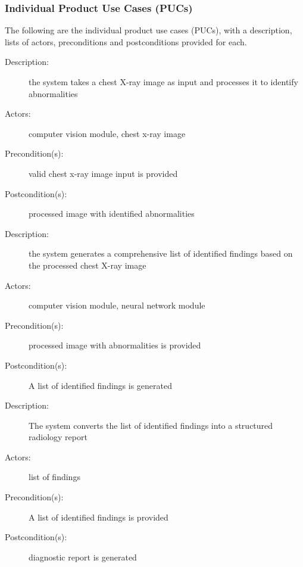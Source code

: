 \documentclass[12pt]{article}
\begin{document}
\subsubsection{Individual Product Use Cases (PUCs)}
The following are the individual product use cases (PUCs), with a description, lists of actors, preconditions and postconditions provided for each.
\begin{enumerate}[label=PUC\arabic*., series=pucs]
    \begin{item}
        \begin{description}
            \item[Description:] the system takes a chest X-ray image as input and processes it to identify abnormalities
            \item[Actors:] computer vision module, chest x-ray image
            \item[Precondition(s):] valid chest x-ray image input is provided
            \item[Postcondition(s):] processed image with identified abnormalities
        \end{description}
    \end{item}
    \begin{item}
        \begin{description}
            \item[Description:] the system generates a comprehensive list of identified findings based on the processed chest X-ray image
            \item[Actors:] computer vision module, neural network module 
            \item[Precondition(s):] processed image with abnormalities is provided
            \item[Postcondition(s):] A list of identified findings is generated 
        \end{description}
    \end{item}
    \begin{item}
        \begin{description}
            \item[Description:] The system converts the list of identified findings into a structured radiology report 
            \item[Actors:] list of findings
            \item[Precondition(s):] A list of identified findings is provided
            \item[Postcondition(s):] diagnostic report is generated
        \end{description}

\end{item}
\end{enumerate}
\end{document}
